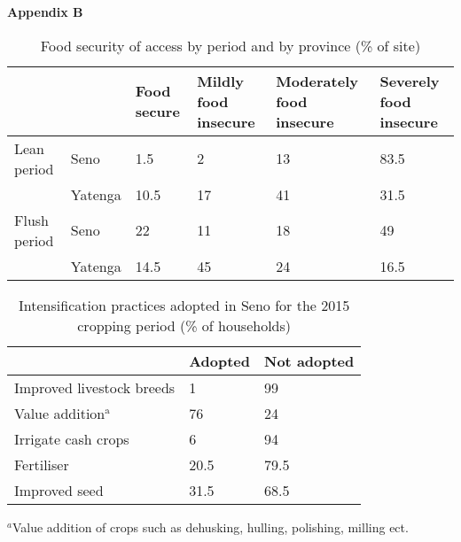 \textbf{Appendix B}

\begin{table}[H]
  \captionsetup{singlelinecheck = false, justification=justified}
  \caption{Food security of access by period and by province (\% of site)}
  \label{tab:B1}
  \small
\begin{tabularx}{\textwidth}{@{}llYYYY@{}}
\toprule
 & & Food secure & Mildly food insecure & Moderately food insecure & Severely food insecure \\
 \midrule
Lean period & Seno & 1.5 & 2 & 13 & 83.5 \\
 & Yatenga & 10.5 & 17 & 41 & 31.5 \\
Flush period & Seno & 22 & 11 & 18 & 49 \\
 & Yatenga & 14.5 & 45 & 24 & 16.5 \\
 \bottomrule
\end{tabularx}
\end{table}

\begin{table}[H]
  \captionsetup{singlelinecheck = false, justification=justified}
  \caption{Intensification practices adopted in Seno for the 2015 cropping period (\% of households)}
  \label{tab:B2}
  \small
\begin{tabularx}{\textwidth}{@{}lYY@{}}
\toprule
 & Adopted & Not adopted \\
 \midrule
Improved livestock breeds & 1 & 99 \\
Value addition$^{\mathrm{a}}$ & 76 & 24 \\
Irrigate cash crops & 6 & 94 \\
Fertiliser & 20.5 & 79.5 \\
Improved seed & 31.5 & 68.5 \\
\bottomrule
\end{tabularx}
\footnotesize
\raggedright
$^a$Value addition of crops such as dehusking, hulling, polishing, milling ect.
\end{table}

